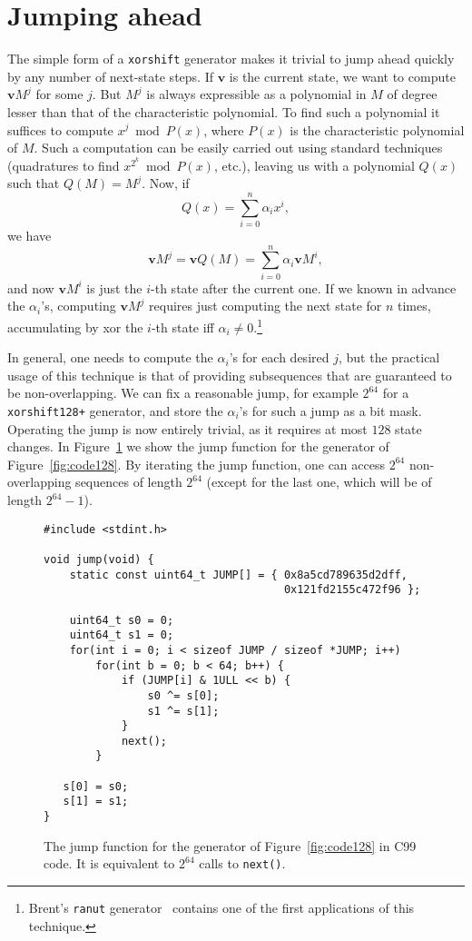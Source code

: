 \documentclass{acmsmalltr}
\newcommand{\xorshift}[1][]{\texttt{xorshift#1}\xspace}
\newcommand{\xorshiftp}[1][]{\texttt{xorshift#1+}\xspace}
\begin{document}
\section{Jumping ahead}

The simple form of a \xorshift generator makes it trivial to jump ahead quickly
by any number of next-state steps. If $\bm v$ is the current state, we want to
compute $\bm v M^j$ for some $j$. But $M^j$ is always expressible as a
polynomial in $M$ of degree lesser than that of the characteristic polynomial.
To find such a polynomial it suffices to compute $x^j \bmod P(x)$, where $P(x)$
is the characteristic polynomial of $M$. Such a computation can be easily
carried out using standard techniques (quadratures to find $x^{2^k}\bmod P(x)$,
etc.), leaving us with a polynomial $Q(x)$ such that $Q(M)=M^j$. Now, if \[
Q(x)=\sum_{i=0}^n \alpha_ix^i, \] we have \[ \bm v M^j = \bm v Q(M)
=\sum_{i=0}^n \alpha_i\bm vM^i, \] and now $\bm v M^i$ is just the $i$-th state
after the current one. If we known in advance the $\alpha_i$'s, computing $\bm
vM^j$ requires just computing the next state for $n$ times, accumulating by xor
the $i$-th state iff $\alpha_i\neq0$.\footnote{Brent's
\texttt{ranut} generator~\cite{BreURNGS} contains one of the first
applications of this technique.}

In general, one needs to compute the
$\alpha_i$'s for each desired $j$, but the practical usage of this technique is
that of providing subsequences that are guaranteed to be non-overlapping. We can
fix a reasonable jump, for example $2^{64}$ for a \xorshiftp[128] generator, and
store the $\alpha_i$'s for such a jump as a bit mask. Operating the jump is now
entirely trivial, as it requires at most $128$ state changes. In
Figure~\ref{fig:jump} we show the jump function for the
generator of Figure~\ref{fig:code128}. By iterating the jump function, one can
access $2^{64}$ non-overlapping sequences of length $2^{64}$ 
(except for the last one, which will be of length $2^{64}-1$).

\begin{figure}[ht]
\centering
\begin{verbatim}
#include <stdint.h>

void jump(void) {
    static const uint64_t JUMP[] = { 0x8a5cd789635d2dff,
                                     0x121fd2155c472f96 };
	
    uint64_t s0 = 0;
    uint64_t s1 = 0;
    for(int i = 0; i < sizeof JUMP / sizeof *JUMP; i++)
        for(int b = 0; b < 64; b++) {
            if (JUMP[i] & 1ULL << b) {
                s0 ^= s[0];
                s1 ^= s[1];
            }
            next();
        }

   s[0] = s0;
   s[1] = s1;
}
\end{verbatim}
\caption{\label{fig:jump}The jump function for the generator of Figure~\ref{fig:code128}
in C99 code. It is equivalent to $2^{64}$ calls to \texttt{next()}.}
\end{figure}
\end{document}
